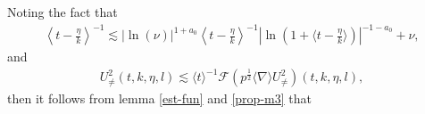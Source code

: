 \documentclass[12pt]{article}
\numberwithin{equation}{section}
\begin{document}
	Noting the fact that
	\begin{align}\label{ineq-m31}
			\left\langle t-\frac{\eta}{k}\right\rangle^{-1}\lesssim|\ln(\nu)|^{1+a_0}\left\langle t-\frac{\eta}{k}\right\rangle^{-1}|\ln(1+\langle t-\frac{\eta}{k}\rangle)|^{-1-a_0}+\nu, 
	\end{align}
	and	
	\begin{align}\label{ineq-m32}
		U^2_{\neq}(t,k,\eta,l)\lesssim  \langle t\rangle ^{-1}	\mathcal{F}(p^{\frac{1}{2}}\langle\nabla\rangle U^2_{\neq})(t,k,\eta,l),
	\end{align}
	then it follows from lemma \ref{est-fun} and \eqref{prop-m3} that
\end{document}
